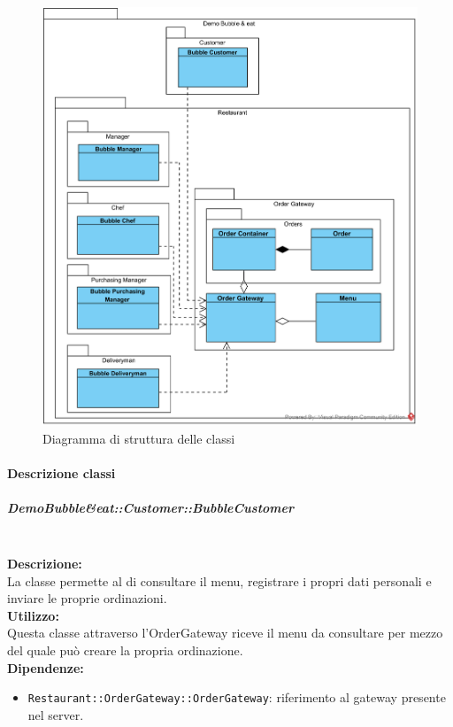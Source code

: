 \begin{figure}[H]
	\centering
	\includegraphics[width=13cm]{diagrammi_img/classi_e_package/demo_classes.png}
	\caption{Diagramma di struttura delle classi}
\end{figure}

\paragraph{Descrizione classi}

\subparagraph{DemoBubble\&eat\-::Customer\-::Bubble\-Customer}\label{eat-customer}\mbox{}\\
\textbf{Descrizione:}\\
La classe permette al \Customer{} di consultare il menu, registrare i propri dati personali e inviare le proprie ordinazioni.\\
\textbf{Utilizzo:}\\
Questa classe attraverso l'Order\-Gateway riceve il menu da consultare per mezzo del quale può creare la propria ordinazione.\\
\textbf{Dipendenze:}
\begin{itemize}
	\item \texttt{Restaurant::OrderGateway::OrderGateway}: riferimento al gateway presente nel server.
\end{itemize}

